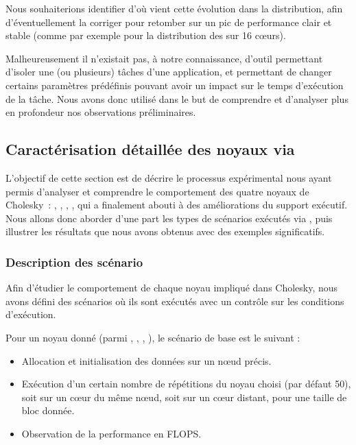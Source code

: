 Nous souhaiterions identifier d'où vient cette évolution dans la distribution, afin d'éventuellement la corriger pour retomber sur un pic de performance clair et stable (comme par exemple pour la distribution des \potrf sur 16 cœurs).

Malheureusement il n'existait pas, à notre connaissance, d'outil permettant d'isoler une (ou plusieurs) tâches d'une application, et permettant de changer certains paramètres prédéfinis pouvant avoir un impact sur le temps d'exécution de la tâche.
Nous avons donc utilisé \outil dans le but de comprendre et d'analyser plus en profondeur nos observations préliminaires.

\subsection{Caractérisation détaillée des noyaux via \outil}\label{sec:contribs:apps:cholesky:carton}

L'objectif de cette section est de décrire le processus expérimental nous ayant permis d'analyser et comprendre le comportement des quatre noyaux de Cholesky~: \potrf, \trsm, \syrk, \gemm, qui a finalement abouti à des améliorations du support exécutif.
Nous allons donc aborder d'une part les types de scénarios exécutés via \outil, puis illustrer les résultats que nous avons obtenus avec des exemples significatifs.

\subsubsection{Description des scénario}\label{sec:contribs:apps:cholesky:scenario}

Afin d'étudier le comportement de chaque noyau impliqué dans Cholesky, nous avons défini des scénarios où ils sont exécutés avec un contrôle sur les conditions d'exécution.

Pour un noyau donné (parmi \potrf, \trsm, \syrk, \gemm), le scénario de base est le suivant :
\begin{itemize}
  \item Allocation et initialisation des données sur un nœud précis.
  \item Exécution d'un certain nombre de répétitions du noyau choisi (par défaut 50), soit sur un cœur du même nœud, soit sur un cœur distant, pour une taille de bloc donnée.
  \item Observation de la performance en FLOPS.
\end{itemize}

